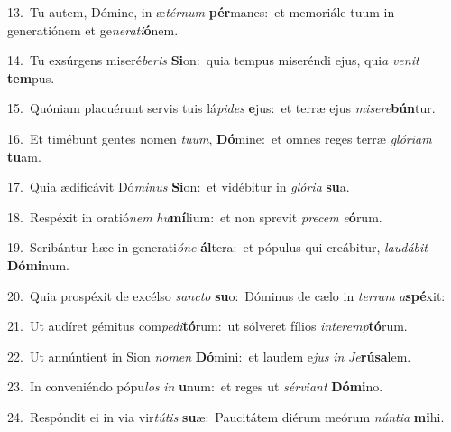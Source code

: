 {\numbfont\textcolor{\numbcolor}{13.}}~Tu autem, Dómine, in æ\-\textit{tér}\-\textit{num} \textbf{pér}\-manes:~\star et memoriále tuum in generatiónem et ge\-\textit{ne}\-\textit{ra}\textit{ti}\textbf{ó}nem.\par
{\numbfont\textcolor{\numbcolor}{14.}}~Tu exsúrgens miseré\-\textit{be}\-\textit{ris} \textbf{Si}\-on:~\star quia tempus miseréndi ejus, qui\textit{a} \textit{ve}\-\textit{nit} \textbf{tem}\-pus.\par
{\numbfont\textcolor{\numbcolor}{15.}}~Quóniam placuérunt servis tuis lá\-\textit{pi}\-\textit{des} \textbf{e}\-jus:~\star et terræ ejus \textit{mi}\-\textit{se}\textit{re}\textbf{bún}tur.\par
{\numbfont\textcolor{\numbcolor}{16.}}~Et timébunt gentes nomen \textit{tu}\-\textit{um}, \textbf{Dó}\-mine:~\star et omnes reges terræ \textit{gló}\-\textit{ri}\textit{am} \textbf{tu}\-am.\par
{\numbfont\textcolor{\numbcolor}{17.}}~Quia ædificávit Dó\-\textit{mi}\-\textit{nus} \textbf{Si}\-on:~\star et vidébitur in \textit{gló}\-\textit{ri}\textit{a} \textbf{su}\-a.\par
{\numbfont\textcolor{\numbcolor}{18.}}~Respéxit in oratió\textit{nem} \textit{hu}\-\textbf{mí}lium:~\star et non sprevit \textit{pre}\-\textit{cem} \textit{e}\-\textbf{ó}rum.\par
{\numbfont\textcolor{\numbcolor}{19.}}~Scribántur hæc in generati\-\textit{ó}\-\textit{ne} \textbf{ál}\-tera:~\star et pópulus qui creábitur, \textit{lau}\-\textit{dá}\textit{bit} \textbf{Dó}\-\textbf{mi}num.\par
{\numbfont\textcolor{\numbcolor}{20.}}~Quia prospéxit de excélso \textit{sanc}\-\textit{to} \textbf{su}\-o:~\star Dóminus de cælo in \textit{ter}\-\textit{ram} \textit{a}\-\textbf{spé}xit:\par
{\numbfont\textcolor{\numbcolor}{21.}}~Ut audíret gémitus com\-\textit{pe}\-\textit{di}\textbf{tó}rum:~\star ut sólveret fílios \textit{in}\-\textit{ter}\textit{emp}\textbf{tó}rum.\par
{\numbfont\textcolor{\numbcolor}{22.}}~Ut annúntient in Sion \textit{no}\-\textit{men} \textbf{Dó}\-mini:~\star et laudem e\textit{jus} \textit{in} \textit{Je}\-\textbf{rú}\textbf{sa}lem.\par
{\numbfont\textcolor{\numbcolor}{23.}}~In conveniéndo pópu\textit{los} \textit{in} \textbf{u}\-num:~\star et reges ut \textit{sér}\-\textit{vi}\textit{ant} \textbf{Dó}\-\textbf{mi}no.\par
{\numbfont\textcolor{\numbcolor}{24.}}~Respóndit ei in via vir\-\textit{tú}\-\textit{tis} \textbf{su}\-æ:~\star Paucitátem diérum meórum \textit{nún}\-\textit{ti}\textit{a} \textbf{mi}\-hi.\par
